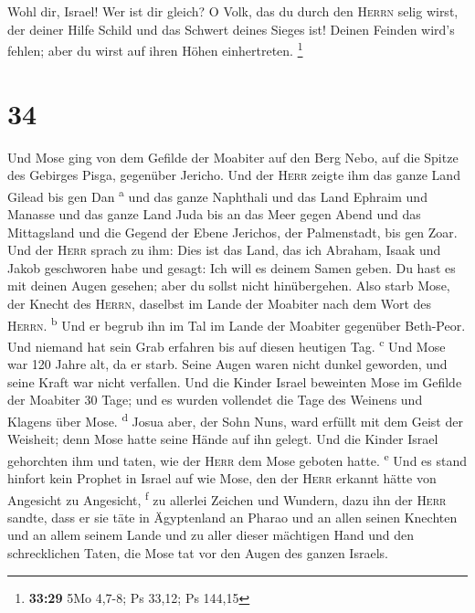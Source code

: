  Wohl dir, Israel! Wer ist dir gleich? O Volk, das du
durch den \textsc{Herrn} selig wirst, der deiner Hilfe Schild und das
Schwert deines Sieges ist! Deinen Feinden wird's fehlen; aber du wirst
auf ihren Höhen einhertreten. \footnote{\textbf{33:29} 5Mo 4,7-8; Ps
  33,12; Ps 144,15}

\hypertarget{section-33}{%
\section{34}\label{section-33}}

 Und Mose ging von dem Gefilde der Moabiter auf den Berg
Nebo, auf die Spitze des Gebirges Pisga, gegenüber Jericho. Und der
\textsc{Herr} zeigte ihm das ganze Land Gilead bis gen Dan
\textsuperscript{a}  und das ganze Naphthali und das Land
Ephraim und Manasse und das ganze Land Juda bis an das Meer gegen Abend
 und das Mittagsland und die Gegend der Ebene Jerichos,
der Palmenstadt, bis gen Zoar.  Und der \textsc{Herr}
sprach zu ihm: Dies ist das Land, das ich Abraham, Isaak und Jakob
geschworen habe und gesagt: Ich will es deinem Samen geben. Du hast es
mit deinen Augen gesehen; aber du sollst nicht hinübergehen.
 Also starb Mose, der Knecht des \textsc{Herrn}, daselbst
im Lande der Moabiter nach dem Wort des \textsc{Herrn}.
\textsuperscript{b}  Und er begrub ihn im Tal im Lande der
Moabiter gegenüber Beth-Peor. Und niemand hat sein Grab erfahren bis auf
diesen heutigen Tag. \textsuperscript{c}  Und Mose war 120
Jahre alt, da er starb. Seine Augen waren nicht dunkel geworden, und
seine Kraft war nicht verfallen.  Und die Kinder Israel
beweinten Mose im Gefilde der Moabiter 30 Tage; und es wurden vollendet
die Tage des Weinens und Klagens über Mose. \textsuperscript{d}
 Josua aber, der Sohn Nuns, ward erfüllt mit dem Geist der
Weisheit; denn Mose hatte seine Hände auf ihn gelegt. Und die Kinder
Israel gehorchten ihm und taten, wie der \textsc{Herr} dem Mose geboten
hatte. \textsuperscript{e}  Und es stand hinfort kein
Prophet in Israel auf wie Mose, den der \textsc{Herr} erkannt hätte von
Angesicht zu Angesicht, \textsuperscript{f}  zu allerlei
Zeichen und Wundern, dazu ihn der \textsc{Herr} sandte, dass er sie täte
in Ägyptenland an Pharao und an allen seinen Knechten und an allem
seinem Lande  und zu aller dieser mächtigen Hand und den
schrecklichen Taten, die Mose tat vor den Augen des ganzen Israels.
